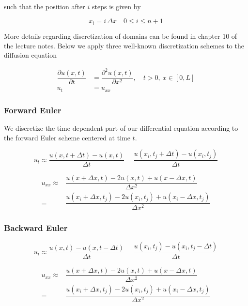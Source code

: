 \documentclass[a4paper, fontsize=11pt]{article}
\begin{document}
such that the position after $i$ steps is given by 

\begin{equation}
x_{i} = i \, \Delta x \quad 0 \leq i \leq n+1
\end{equation}

More details regarding discretization of domains can be found in chapter 10 of the lecture notes. \cite{statphys} Below we apply three well-known discretization schemes to the diffusion equation

\begin{align}
\dfrac{\partial u(x,t)}{\partial t}  &= \dfrac{\partial^2 u(x,t)}{\partial x^2}, \quad t > 0, \: x \in [0, L]
\\
u_{t} &= u_{xx}
\end{align}

\subsubsection{Forward Euler}

We discretize the time dependent part of our differential equation according to the forward Euler scheme centered at time $t$.

\begin{equation}
u_{t} \approx \dfrac{u(x, t+ \Delta t) - u(x, t)}{\Delta t} = \dfrac{u(x_{i}, t_{j}+ \Delta t) - u(x_{i}, t_{j})}{\Delta t}
\end{equation}


\begin{align}
u_{xx} \approx& \dfrac{u(x + \Delta x, t) - 2u(x, t) + u(x - \Delta x, t)}{\Delta x^2}
\\
=&\dfrac{u(x_{i} + \Delta x, t_{j}) - 2u(x_{i}, t_{j}) + u(x_{i} - \Delta x, t_{j})}{\Delta x^2}
\end{align}

\subsubsection{Backward Euler}

\begin{equation}
u_{t} \approx \dfrac{u(x, t) - u(x, t - \Delta t)}{\Delta t} = \dfrac{u(x_{i}, t_{j}) - u(x_{i}, t_{j} -  \Delta t)}{\Delta t}
\end{equation}


\begin{align}
u_{xx} \approx& \dfrac{u(x + \Delta x, t) - 2u(x, t) + u(x - \Delta x, t)}{\Delta x^2}
\\
=&\dfrac{u(x_{i} + \Delta x, t_{j}) - 2u(x_{i}, t_{j}) + u(x_{i} - \Delta x, t_{j})}{\Delta x^2}
\end{align}
\end{document}

